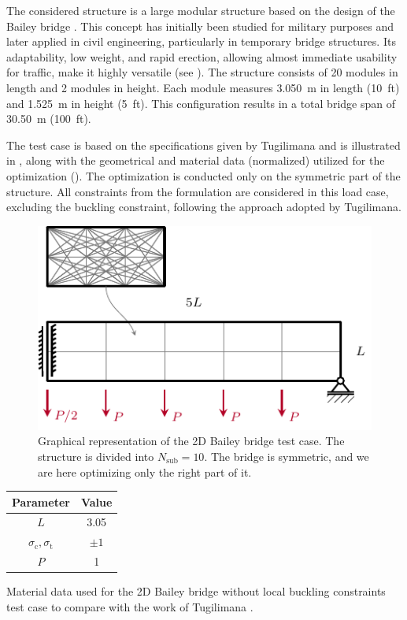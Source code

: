 The considered structure is a large modular structure based on the design of the Bailey bridge . This concept has initially been studied for military purposes and later applied in civil engineering, particularly in temporary bridge structures. Its adaptability, low weight, and rapid erection, allowing almost immediate usability for traffic, make it highly versatile (see ). The structure consists of 20 modules in length and 2 modules in height. Each module measures \qty{3.050}{m} in length (\qty{10}{ft}) and \qty{1.525}{m} in height (\qty{5}{ft}). This configuration results in a total bridge span of \qty{30.50}{m} (\qty{100}{ft}).

The test case is based on the specifications given by Tugilimana \etal {} and is illustrated in , along with the geometrical and material data (normalized) utilized for the optimization (). The optimization is conducted only on the symmetric part of the structure. All constraints from the formulation  are considered in this load case, excluding the buckling constraint, following the approach adopted by Tugilimana.


\begin{figure}
    \centering
    \includegraphics{figures/06_DMO/00_tug_bench_bcs/bcs.pdf}
    \caption{Graphical representation of the 2D Bailey bridge test case. The structure is divided into $N_\text{sub}=10$. The bridge is symmetric, and we are here optimizing only the right part of it.}
    \label{fig:06_tug_bcs}
\end{figure}

\begin{margintable}
    \small
    \centering
    \begin{tabular}{cc}
    \toprule
    \textbf{Parameter}        & \textbf{Value} \\ \midrule
    $L$              & 3.05     \\
    $\sigma_\text{c}, \sigma_\text{t}$ & $\pm 1$\\
    $P$              & 1   \\
    \bottomrule
    \end{tabular}
    \caption{Material data used for the 2D Bailey bridge without local buckling constraints test case to compare with the work of Tugilimana \etal \cite{tugilimana_integrated_2019}.}
    \label{tab:06_modular_tug}
\end{margintable}

